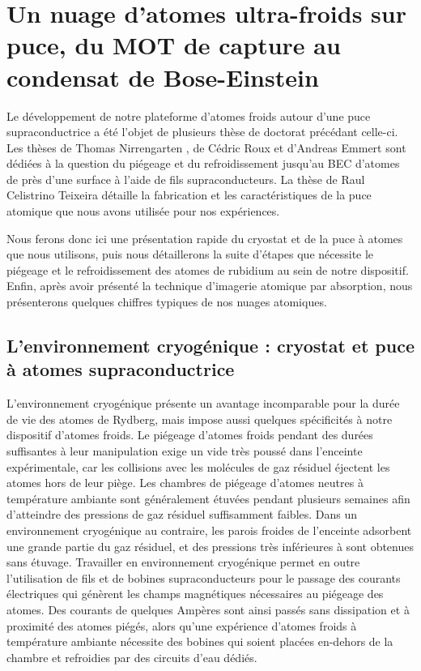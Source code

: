 \section{Un nuage d'atomes ultra-froids sur puce, du MOT de capture au condensat de Bose-Einstein}
\noindent Le développement de notre plateforme d'atomes froids autour d'une puce supraconductrice a été l'objet de plusieurs thèse de doctorat précédant celle-ci.
Les thèses de Thomas Nirrengarten \cite{PHD_NIRRENGARTEN}, de Cédric Roux \cite{PHD_ROUX} et d'Andreas Emmert \cite{PHD_EMMERT} sont dédiées à la question du piégeage et du refroidissement jusqu'au BEC d'atomes de  près d'une surface à l'aide de fils supraconducteurs.
La thèse de Raul Celistrino Teixeira \cite{PHD_CELISTRINO} détaille la fabrication et les caractéristiques de la puce atomique que nous avons utilisée pour nos expériences.

Nous ferons donc ici une présentation rapide du cryostat et de la puce à atomes que nous utilisons, puis nous détaillerons la suite d'étapes que nécessite le piégeage et le refroidissement des atomes de rubidium au sein de notre dispositif.
Enfin, après avoir présenté la technique d'imagerie atomique par absorption, nous présenterons quelques chiffres typiques de nos nuages atomiques.


\subsection{L'environnement cryogénique : cryostat et puce à atomes supraconductrice}\label{subsec:cryopuce}
\noindent L'environnement cryogénique présente un avantage incomparable pour la durée de vie des atomes de Rydberg, mais impose aussi quelques spécificités à notre dispositif d'atomes froids.
Le piégeage d'atomes froids pendant des durées suffisantes à leur manipulation exige un vide très poussé dans l'enceinte expérimentale, car les collisions avec les molécules de gaz résiduel éjectent les atomes hors de leur piège.
Les chambres de piégeage d'atomes neutres à température ambiante sont généralement étuvées pendant plusieurs semaines afin d'atteindre des pressions de gaz résiduel suffisamment faibles.
Dans un environnement cryogénique au contraire, les parois froides de l'enceinte adsorbent une grande partie du gaz résiduel, et des pressions très inférieures à  sont obtenues sans étuvage.
Travailler en environnement cryogénique permet en outre l'utilisation de fils et de bobines supraconducteurs pour le passage des courants électriques qui génèrent les champs magnétiques nécessaires au piégeage des atomes.
Des courants de quelques Ampères sont ainsi passés sans dissipation et à proximité des atomes piégés, alors qu'une expérience d'atomes froids à température ambiante nécessite des bobines qui soient placées en-dehors de la chambre et refroidies par des circuits d'eau dédiés.

